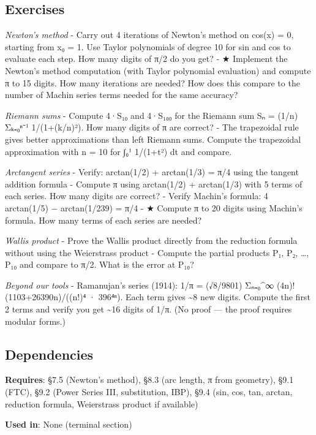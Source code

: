 \documentclass[
  10pt,
  letterpaper,
]{scrbook}
\begin{document}
\subsection{Exercises}\label{exercises-42}

\emph{Newton's method} - Carry out 4 iterations of Newton's method on
cos(x) = 0, starting from x₀ = 1. Use Taylor polynomials of degree 10
for sin and cos to evaluate each step. How many digits of π/2 do you
get? - ★ Implement the Newton's method computation (with Taylor
polynomial evaluation) and compute π to 15 digits. How many iterations
are needed? How does this compare to the number of Machin series terms
needed for the same accuracy?

\emph{Riemann sums} - Compute 4·S₁₀ and 4·S₁₀₀ for the Riemann sum Sₙ =
(1/n) Σₖ₌₀ⁿ⁻¹ 1/(1+(k/n)²). How many digits of π are correct? - The
trapezoidal rule gives better approximations than left Riemann sums.
Compute the trapezoidal approximation with n = 10 for ∫₀¹ 1/(1+t²) dt
and compare.

\emph{Arctangent series} - Verify: arctan(1/2) + arctan(1/3) = π/4 using
the tangent addition formula - Compute π using arctan(1/2) + arctan(1/3)
with 5 terms of each series. How many digits are correct? - Verify
Machin's formula: 4 arctan(1/5) − arctan(1/239) = π/4 - ★ Compute π to
20 digits using Machin's formula. How many terms of each series are
needed?

\emph{Wallis product} - Prove the Wallis product directly from the
reduction formula without using the Weierstrass product - Compute the
partial products P₁, P₂, \ldots, P₁₀ and compare to π/2. What is the
error at P₁₀?

\emph{Beyond our tools} - Ramanujan's series (1914): 1/π = (√8/9801)
Σₙ₌₀\^{}∞ (4n)!(1103+26390n)/((n!)⁴ · 396⁴ⁿ). Each term gives
\textasciitilde8 new digits. Compute the first 2 terms and verify you
get \textasciitilde16 digits of 1/π. (No proof --- the proof requires
modular forms.)

\subsection{Dependencies}\label{dependencies-42}

\textbf{Requires}: §7.5 (Newton's method), §8.3 (arc length, π from
geometry), §9.1 (FTC), §9.2 (Power Series III, substitution, IBP), §9.4
(sin, cos, tan, arctan, reduction formula, Weierstrass product if
available)

\textbf{Used in}: None (terminal section)
\end{document}
